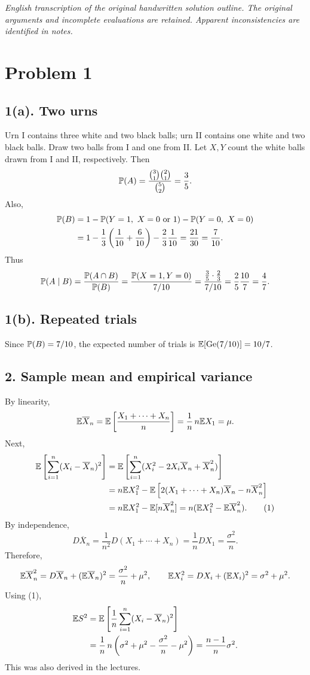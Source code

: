\documentclass[11pt,a4paper]{article}
\begin{document}
\noindent\emph{English transcription of the original handwritten solution outline. The original arguments and incomplete evaluations are retained. Apparent inconsistencies are identified in notes.}

\section*{Problem 1}
\subsection*{1(a). Two urns}
Urn I contains three white and two black balls; urn II contains one white and two black balls. Draw two balls from I and one from II. Let $X,Y$ count the white balls drawn from I and II, respectively. Then
\[
\P(A)=\frac{\binom31\binom21}{\binom52}=\frac35.
\]
Also,
\begin{align*}
\P(B)&=1-\P(Y=1,\ X=0\text{ or }1)-\P(Y=0,\ X=0)\\
&=1-\frac13\left(\frac1{10}+\frac6{10}\right)-\frac23\frac1{10}
=\frac{21}{30}=\frac7{10}.
\end{align*}
Thus
\[
\P(A\mid B)=\frac{\P(A\cap B)}{\P(B)}
=\frac{\P(X=1,Y=0)}{7/10}
=\frac{\frac35\cdot\frac23}{7/10}=\frac25\frac{10}7=\frac47.
\]
\subsection*{1(b). Repeated trials}
Since $\P(B)=7/10$, the expected number of trials is $\E[\operatorname{Ge}(7/10)]=10/7$.

\subsection*{2. Sample mean and empirical variance}
By linearity,
\[
\E\overline X_n=\E\left[\frac{X_1+\cdots+X_n}{n}\right]
=\frac1n\,n\E X_1=\mu.
\]
Next,
\begin{align*}
\E\left[\sum_{i=1}^n(X_i-\overline X_n)^2\right]
&=\E\left[\sum_{i=1}^n(X_i^2-2X_i\overline X_n+\overline X_n^2)\right]\\
&=n\E X_1^2-\E\left[2(X_1+\cdots+X_n)\overline X_n-n\overline X_n^2\right]\\
&=n\E X_1^2-\E[n\overline X_n^2]
=n(\E X_1^2-\E\overline X_n^2).\tag{1}
\end{align*}
By independence,
\[
D\overline X_n=\frac1{n^2}D(X_1+\cdots+X_n)
=\frac1nDX_1=\frac{\sigma^2}n.
\]
Therefore,
\[
\E\overline X_n^2=D\overline X_n+(\E\overline X_n)^2
=\frac{\sigma^2}n+\mu^2,
\qquad\E X_i^2=DX_i+(\E X_i)^2=\sigma^2+\mu^2.
\]
Using (1),
\begin{align*}
\E S^2&=\E\left[\frac1n\sum_{i=1}^n(X_i-\overline X_n)^2\right]\\
&=\frac1n\,n\left(\sigma^2+\mu^2-\frac{\sigma^2}n-\mu^2\right)
=\frac{n-1}n\sigma^2.
\end{align*}
This was also derived in the lectures.
\end{document}

